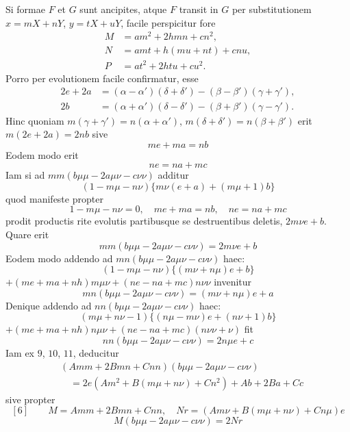 \documentclass[12pt,a4paper]{article}
\begin{document}
Si formae $F$ et $G$ sunt ancipites, atque $F$ transit in $G$ per substitutionem
$x = mX + nY$, $y = tX + uY$, facile perspicitur fore
\begin{align*}
M &= am^2 + 2hmn + cn^2, \\
N &= amt + h(mu + nt) + cnu, \\
P &= at^2 + 2htu + cu^2.
\end{align*}
Porro per evolutionem facile confirmatur, esse
\begin{align*}
2e + 2a &= (\alpha - \alpha')(\delta + \delta') - (\beta - \beta')(\gamma + \gamma'), \\
2b &= (\alpha + \alpha')(\delta - \delta') - (\beta + \beta')(\gamma - \gamma').
\end{align*}
Hinc quoniam $m(\gamma + \gamma') = n(\alpha + \alpha')$, $m(\delta + \delta') = n(\beta + \beta')$ erit
$m(2e + 2a) = 2nb$ sive
\[
me + ma = nb \tag{7}
\]
Eodem modo erit
\[
ne = na + mc \tag{8}
\]
Iam si ad $mm(b\mu\mu - 2a\mu\nu - c\nu\nu)$ additur
\[
(1 - m\mu - n\nu)\{m\nu(e+a) + (m\mu + 1)b\}
\]
quod manifeste propter
\[
1 - m\mu - n\nu = 0, \quad me + ma = nb, \quad ne = na + mc
\]
prodit productis rite evolutis partibusque se destruentibus deletis, $2m\nu e + b$.
Quare erit
\[
mm(b\mu\mu - 2a\mu\nu - c\nu\nu) = 2m\nu e + b \tag{9}
\]
Eodem modo addendo ad $mn(b\mu\mu - 2a\mu\nu - c\nu\nu)$ haec:
\[
(1 - m\mu - n\nu)\{(m\nu + n\mu)e + b\}
\]
$+ (me + ma + nh)m\mu\nu + (ne - na + mc)n\nu\nu$
invenitur
\[
mn(b\mu\mu - 2a\mu\nu - c\nu\nu) = (m\nu + n\mu)e + a \tag{10}
\]
Denique addendo ad $nn(b\mu\mu - 2a\mu\nu - c\nu\nu)$ haec:
\[
(m\mu + n\nu - 1)\{(n\mu - m\nu)e + (n\nu + 1)b\}
\]
$+ (me + ma + nh)n\mu\nu + (ne - na + mc)(n\nu\nu + \nu)$
fit
\[
nn(b\mu\mu - 2a\mu\nu - c\nu\nu) = 2n\mu e + c \tag{11}
\]
Iam ex $9$, $10$, $11$, deducitur
\begin{align*}
&(Amm + 2Bmn + Cnn)(b\mu\mu - 2a\mu\nu - c\nu\nu) \\
&\quad = 2e(Am^2 + B(m\mu + n\nu) + Cn^2) + Ab + 2Ba + Cc
\end{align*}
sive propter
\[
[6] \qquad M = Amm + 2Bmn + Cnn, \quad Nr = (Am\nu + B(m\mu + n\nu) + Cn\mu)e
\]
\[
M(b\mu\mu - 2a\mu\nu - c\nu\nu) = 2Nr \tag{Q.E.D.}
\]
\end{document}
